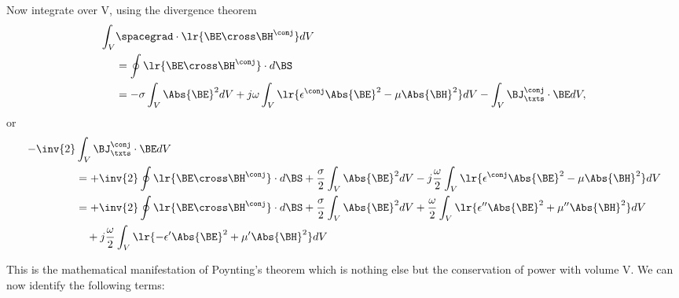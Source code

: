 Now integrate over V, using the divergence theorem
\begin{equation}\label{eqn:uwavesLecture2:1280}
\begin{aligned}
\int_V &
\spacegrad \cdot \lr{ \BE \cross \BH^\conj } dV \\
&=
\oint \lr{ \BE \cross \BH^\conj } \cdot d\BS
\\ &=
- \sigma \int_V \Abs{\BE}^2 dV
+ j \omega \int_V \lr{ \epsilon^\conj \Abs{\BE}^2 -\mu \Abs{\BH}^2 } dV
- \int_V \BJ_\txts^\conj \cdot \BE dV,
\end{aligned}
\end{equation}
or
\begin{equation}\label{eqn:uwavesLecture2:1300}
\begin{aligned}
-\inv{2} &\int_V \BJ_\txts^\conj \cdot \BE dV \\
&=
+ \inv{2} \oint \lr{ \BE \cross \BH^\conj } \cdot d\BS
+ \frac{\sigma}{2} \int_V \Abs{\BE}^2 dV
- j \frac{\omega}{2} \int_V \lr{ \epsilon^\conj \Abs{\BE}^2 -\mu \Abs{\BH}^2 } dV
\\ &=
+ \inv{2} \oint \lr{ \BE \cross \BH^\conj } \cdot d\BS
+ \frac{\sigma}{2} \int_V \Abs{\BE}^2 dV
+ \frac{\omega}{2} \int_V \lr{ \epsilon'' \Abs{\BE}^2 + \mu'' \Abs{\BH}^2 } dV \\
&\quad
+ j \frac{\omega}{2} \int_V \lr{ -\epsilon' \Abs{\BE}^2 + \mu' \Abs{\BH}^2 } dV
\end{aligned}
\end{equation}

This is the mathematical manifestation of Poynting's theorem which is nothing else but the conservation of power with volume V.  We can now identify the following terms:

